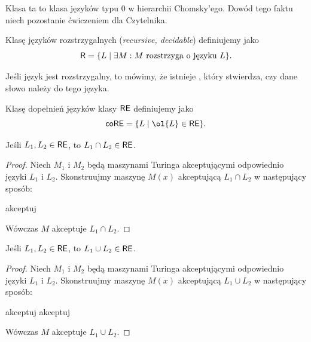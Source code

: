 Klasa ta to klasa języków typu 0 w hierarchii Chomsky'ego. Dowód tego faktu niech pozostanie ćwiczeniem dla Czytelnika.

\begin{definition}
    Klasę języków rozstrzygalnych (\textit{recursive, decidable}) definiujemy jako
    \[ \textsf{R} = \{L \mid \exists M : M \text{ rozstrzyga o języku } L \}. \]
\end{definition}

Jeśli język jest rozstrzygalny, to mówimy, że istnieje , który stwierdza, czy dane słowo należy do tego języka.

\begin{definition} Klasę dopełnień języków klasy $\textsf{RE}$ definiujemy jako
    \[ \coREclass = \{L \mid \ol{L} \in \REclass \}. \]
\end{definition}

\begin{lemma}
    Jeśli $L_1, L_2 \in \textsf{RE}$, to $L_1 \cap L_2 \in \textsf{RE}$.
\end{lemma}
\begin{proof}
    Niech $M_1$ i $M_2$ będą maszynami Turinga akceptującymi odpowiednio języki $L_1$ i $L_2$. Skonstruujmy maszynę $M(x)$ akceptującą $L_1 \cap L_2$ w następujący sposób:
    \begin{algorithmic}
            \State akceptuj
        \EndIf
    \end{algorithmic}
    Wówczas $M$ akceptuje $L_1 \cap L_2$.
\end{proof}

\begin{lemma}\label{l:union of langugages in RE}
    Jeśli $L_1, L_2 \in \textsf{RE}$, to $L_1 \cup L_2 \in \textsf{RE}$.
\end{lemma}
\begin{proof}
    Niech $M_1$ i $M_2$ będą maszynami Turinga akceptującymi odpowiednio języki $L_1$ i $L_2$. Skonstruujmy maszynę $M(x)$ akceptującą $L_1 \cup L_2$ w następujący sposób:
    \begin{algorithmic}
                \State akceptuj
            \EndIf
                \State akceptuj
            \EndIf
        \EndFor
    \end{algorithmic}
    Wówczas $M$ akceptuje $L_1 \cup L_2$.
\end{proof}

